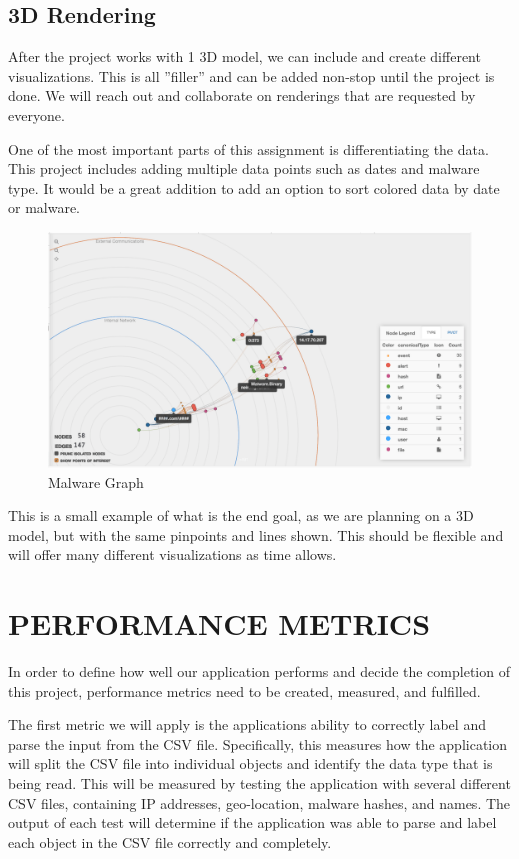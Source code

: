 \documentclass[journal,10pt,onecolumn,compsoc]{IEEEtran} \usepackage[margin=1.0in]{geometry} \usepackage{pdfpages}
\begin{document}
\subsection{3D Rendering}
After the project works with 1 3D model, we can include and create different visualizations. This is all ”filler” and can be added non-stop until the project is done. We will reach out and collaborate on renderings that are requested by everyone.

One of the most important parts of this assignment is differentiating the data. This project includes adding multiple data points such as dates and malware type. It would be a great addition to add an option to sort colored data by date or malware.
 
 \begin{figure}[H]
     \centering
       		\caption{ Malware Graph}
            \includegraphics[width=\linewidth]{./Graph1.png}
 \end{figure}

This is a small example\cite{MalwareGraph} of what is the end goal, as we are planning on a 3D model, but with the same pinpoints and lines shown. This should be flexible and will offer many different visualizations as time allows.



\section{PERFORMANCE METRICS}
    In order to define how well our application performs and decide the completion of this project, performance metrics need to be created, measured, and fulfilled.

    The first metric we will apply is the applications ability to correctly label and parse the input from the CSV file. Specifically, this measures how the application will split the CSV file into individual objects and identify the data type that is being read. This will be measured by testing the application with several different CSV files, containing IP addresses, geo-location, malware hashes, and names. The output of each test will determine if the application was able to parse and label each object in the CSV file correctly and completely.
\end{document}
